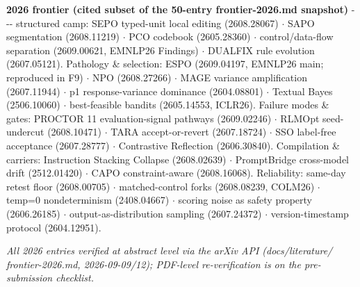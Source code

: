 \textbf{2026 frontier (cited subset of the 50-entry frontier-2026.md snapshot)} -\/-\/- structured camp: SEPO typed-unit local editing (2608.28067) \(\cdot\) SAPO segmentation (2608.11219) \(\cdot\) PCO codebook (2605.28360) \(\cdot\) control/data-flow separation (2609.00621, EMNLP26 Findings) \(\cdot\) DUALFIX rule evolution (2607.05121). Pathology \& selection: ESPO (2609.04197, EMNLP26 main; reproduced in F9) \(\cdot\) NPO (2608.27266) \(\cdot\) MAGE variance amplification (2607.11944) \(\cdot\) p1 response-variance dominance (2604.08801) \(\cdot\) Textual Bayes (2506.10060) \(\cdot\) best-feasible bandits (2605.14553, ICLR26). Failure modes \& gates: PROCTOR 11 evaluation-signal pathways (2609.02246) \(\cdot\) RLMOpt seed-undercut (2608.10471) \(\cdot\) TARA accept-or-revert (2607.18724) \(\cdot\) SSO label-free acceptance (2607.28777) \(\cdot\) Contrastive Reflection (2606.30840). Compilation \& carriers: Instruction Stacking Collapse (2608.02639) \(\cdot\) PromptBridge cross-model drift (2512.01420) \(\cdot\) CAPO constraint-aware (2608.16068). Reliability: same-day retest floor (2608.00705) \(\cdot\) matched-control forks (2608.08239, COLM26) \(\cdot\) temp=0 nondeterminism (2408.04667) \(\cdot\) scoring noise as safety property (2606.26185) \(\cdot\) output-as-distribution sampling (2607.24372) \(\cdot\) version-timestamp protocol (2604.12951).

\emph{All 2026 entries verified at abstract level via the arXiv API (docs/literature/ frontier-2026.md, 2026-09-09/12); PDF-level re-verification is on the pre-submission checklist.}
